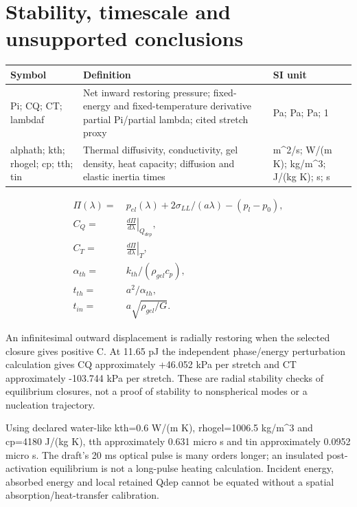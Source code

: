 \documentclass[11pt]{article}
\begin{document}
\section{Stability, timescale and unsupported conclusions}\label{sec:limits}

\begin{longtable}{p{.18\linewidth}p{.60\linewidth}p{.15\linewidth}}Symbol & Definition & SI unit\\\hline

Pi; CQ; CT; lambdaf & Net inward restoring pressure; fixed-energy and fixed-temperature derivative partial Pi/partial lambda; cited stretch proxy & Pa; Pa; Pa; 1\\

alphath; kth; rhogel; cp; tth; tin & Thermal diffusivity, conductivity, gel density, heat capacity; diffusion and elastic inertia times & m\textasciicircum{}2/s; W/(m K); kg/m\textasciicircum{}3; J/(kg K); s; s\\

\end{longtable}

\begin{align*}
\Pi(\lambda)= & ~p_{el}(\lambda)+2\sigma_{LL}/(a\lambda)-(p_l-p_0), \\
C_Q= & ~\left.\frac{d\Pi}{d\lambda}\right|_{Q_{dep}}, \\
C_T= & ~\left.\frac{d\Pi}{d\lambda}\right|_T, \\
\alpha_{th}= & ~k_{th}/(\rho_{gel}c_p), \\
t_{th}= & ~a^2/\alpha_{th}, \\
t_{in}= & ~a\sqrt{\rho_{gel}/G}.
\end{align*}

An infinitesimal outward displacement is radially restoring when the selected closure gives positive C. At 11.65 pJ the independent phase/energy perturbation calculation gives CQ approximately +46.052 kPa per stretch and CT approximately -103.744 kPa per stretch. These are radial stability checks of equilibrium closures, not a proof of stability to nonspherical modes or a nucleation trajectory.

Using declared water-like kth=0.6 W/(m K), rhogel=1006.5 kg/m\textasciicircum{}3 and cp=4180 J/(kg K), tth approximately 0.631  micro s and tin approximately 0.0952  micro s. The draft's 20 ms optical pulse is many orders longer; an insulated post-activation equilibrium is not a long-pulse heating calculation. Incident energy, absorbed energy and local retained Qdep cannot be equated without a spatial absorption/heat-transfer calibration.
\end{document}
